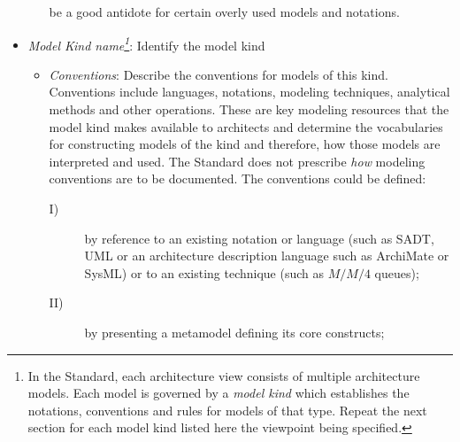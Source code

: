 \begin{itemize}
\begin{itemize}
be a good antidote for certain overly used models and notations.
\end{itemize}
\item {\em Model Kind name\footnote{In the Standard, each architecture view consists of multiple
architecture models. Each model is governed by a \textit{model kind}
which establishes the notations, conventions and rules for models of
that type.  
Repeat the next section for each model kind listed here the viewpoint
being specified.}}:  Identify the model kind
\begin{itemize}
\item {\em Conventions}: Describe the conventions for models of this kind. Conventions include languages, notations, modeling techniques,
analytical methods and other operations. These are key modeling
resources that the model kind makes available to architects and
determine the vocabularies for constructing models of the kind and
therefore, how those models are interpreted and used.
The Standard does not prescribe \emph{how} modeling conventions are to
be documented.  The conventions could be defined:
\begin{description}
\item[I)] by reference to an existing notation or language (such as
  SADT, UML or an architecture description language such as ArchiMate
  or SysML) or to an existing technique (such as $M/M/4$ queues);
\item[II)] by presenting a metamodel defining its core constructs;

\end{description}
\end{itemize}
\end{itemize}
